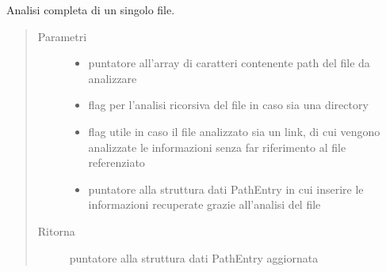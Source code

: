 \documentclass[letterpaper,10pt,italian,openany,oneside]{sphinxmanual}
\begin{document}
\begin{fulllineitems}
\label{\detokenize{documentazione:c.scanFilePath}}
Analisi completa di un singolo file.
\begin{quote}\begin{description}
\item[{Parametri}] \leavevmode\begin{itemize}
\item {} 
 \textendash{} puntatore all’array di caratteri contenente path del file da analizzare

\item {} 
 \textendash{} flag per l’analisi ricorsiva del file in caso sia una directory

\item {} 
 \textendash{} flag utile in caso il file analizzato sia un link, di cui vengono analizzate le informazioni senza far riferimento al file referenziato

\item {} 
 \textendash{} puntatore alla struttura dati PathEntry in cui inserire le informazioni recuperate grazie all’analisi del file

\end{itemize}

\item[{Ritorna}] \leavevmode
puntatore alla struttura dati PathEntry aggiornata

\end{description}\end{quote}

\end{fulllineitems}

\end{document}
